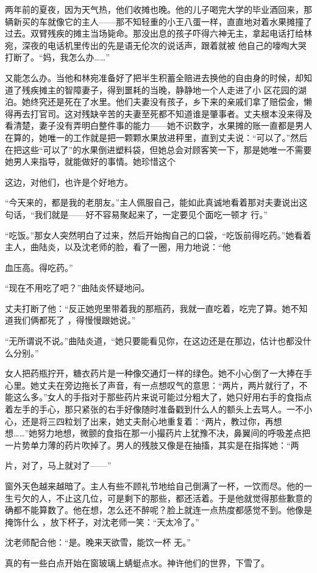 \documentclass{article}
\begin{document}
两年前的夏夜，因为天气热，他们收摊也晚。他的儿子喝完大学的毕业酒回来，那辆新买的车就像它的主人——那不知轻重的小王八蛋一样，直直地对着水果摊撞了过去。双臂残疾的摊主当场毙命。那没出息的孩子吓得六神无主，拿起电话打给林宛，深夜的电话机里传出的先是语无伦次的说话声，跟着就被
他自己的嚎啕大哭打断了。“妈，我怎么办……” 

又能怎么办。当他和林宛准备好了把半生积蓄全赔进去换他的自由身的时候，却知道了残疾摊主的智障妻子，得到噩耗的当晚，静静地一个人走进了小
\newpage
区花园的湖泊。她终究还是死在了水里。他们夫妻没有孩子，乡下来的亲戚们拿了赔偿金，懒得再去打官司。这对残缺辛苦的夫妻至死都不知道谁是肇事者。丈夫根本没来得及看清楚，妻子没有弄明白整件事的能力——她不识数字，水果摊的账一直都是男人在算的，她唯一的工作就是把一颗颗水果放进秤里，直到丈夫说：“可以了。”然后在把这些“可以了”的水果倒进塑料袋，但她总会对顾客笑一下，那是她唯一不需要她男人来指导，就能做好的事情。她珍惜这个


这边，对他们，也许是个好地方。 

“今天来的，都是我的老朋友。”主人佩服自己，能如此真诚地看着那对夫妻说出这句话，“我们就是——好不容易聚起来了，一定要见个面吃一顿才
行。” 

“吃饭。”那女人突然明白了过来，然后开始掏自己的口袋，“吃饭前得吃药。”她看着主人，曲陆炎，以及沈老师的脸，看了一圈，用力地说：“他

\newpage
血压高。得吃药。” 


“现在不用吃了吧？”曲陆炎怀疑地问。 

丈夫打断了他：“反正她兜里带着我的那瓶药，我就一直吃着，吃完了算。她不知道我们俩都死了
，得慢慢跟她说。” 

“无所谓说不说。”曲陆炎道，“她只要能看见你，在这边还是在那边，估计也都没什么分别。”

女人把药瓶拧开，糖衣药片是一种像交通灯一样的绿色。她不小心倒了一大捧在手心里。她丈夫在旁边拖长了声音，有一点想叹气的意思：“两片，两片就行了，不能这么多。”女人的手指对于那些药片来说可能过分粗大了，她只好用右手的食指点着左手的手心，那只紧张的右手好像随时准备戳到什么人的额头上去骂人。一不小心，还是将三四粒划了出来，她丈夫耐心地重复着：“两片，教过你，再想想……”她努力地想，微颤的食指在那一小撮药片上犹豫不决，鼻翼间的呼吸差点把一片势单力薄的药片吹掉了。男人的残肢又像是在抽搐，其实是在指挥她：“两
\newpage

片，对了，马上就对了——” 

窗外天色越来越暗了。主人有些不顾礼节地给自己倒满了一杯，一饮而尽。他的一生亏欠的人，不止这几位，可是剩下的那些，都还活着。于是他就觉得那些歉意的确都不能算数了。他在想，怎么还不醉呢？脸上就连一点热度都感觉不到。他像是掩饰什么
，放下杯子，对沈老师一笑：“天太冷了。” 

沈老师配合他：“是。晚来天欲雪，能饮一杯
无。” 

真的有一些白点开始在窗玻璃上蜻蜓点水。神许他们的世界，下雪了。
\end{document}
